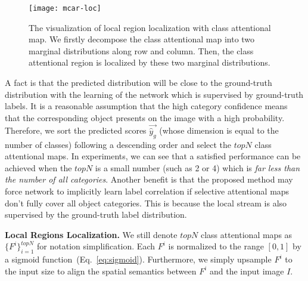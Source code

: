 \documentclass[journal]{IEEEtran}
\begin{document}
\begin{figure}[t]
 \centering
 {\texttt{[image: mcar-loc]}}
\caption{The visualization of local region localization with class attentional map. We firstly decompose the class attentional map into two marginal distributions along row and column. Then, the class attentional region is localized by these two marginal distributions.}\label{fig:mcar}
\end{figure}


A fact is that the predicted distribution will be close to the ground-truth distribution with the learning of the network which is supervised by ground-truth labels. It is a reasonable assumption that the high category confidence means that the corresponding object presents on the image with a high probability. Therefore, we sort the predicted scores $\vec {\hat {y}_g}$ (whose dimension is equal to the number of classes) following a descending order and select the $topN$ class attentional maps. In experiments, we can see that a satisfied performance can be achieved when the $topN$ is a small number (such as 2 or 4) which is \emph{far less than the number of all categories}. Another benefit is that the proposed method may force network to implicitly learn label correlation if selective attentional maps don't fully cover all object categories. This is because the local stream is also supervised by the ground-truth label distribution.

\noindent \textbf{Local Regions Localization.} 
We still denote $topN$ class attentional maps as $\{F^i\}_{i=1}^{topN}$ for notation simplification. Each $F^i$ is normalized to the range $[0,1]$ by a sigmoid function~(Eq.~\ref{eq:sigmoid}). Furthermore, we simply upsample  $F^i$ to the input size to align the spatial semantics between $F^i$ and the input image $I$.
\end{document}
